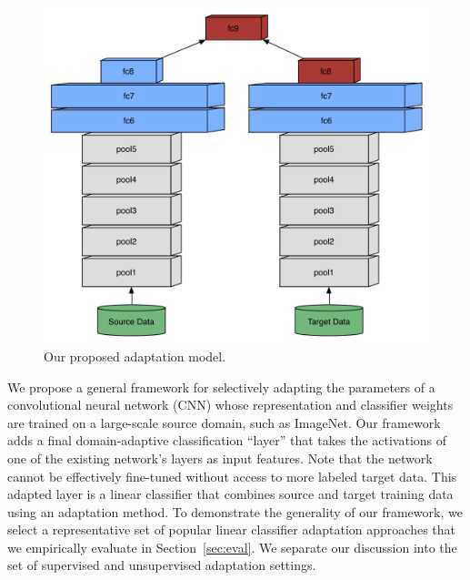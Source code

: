 
\newcommand{\svmT}{\bm{\theta}}
\newcommand{\svmB}{b}
\newcommand{\svmAug}{\tilde{\svmT}}
\newcommand{\svmAugAll}{\bm{\Theta}}

\begin{figure}
\begin{center}
\includegraphics[width=.7\linewidth]{figs/model-adapt}
\end{center}
\caption{Our proposed adaptation model.}
\label{fig:model}
\end{figure}



We propose a general framework for selectively adapting the parameters of a convolutional neural network (CNN) whose representation and classifier weights are trained on a large-scale source domain, such as ImageNet.
Our framework adds a final domain-adaptive classification ``layer'' that takes the activations of one of the existing network's layers as input features. Note that the network cannot be effectively fine-tuned without access to more labeled target data. This adapted layer is a linear classifier that combines source and target training data using an adaptation method. To demonstrate the generality of our framework, we select a representative set of popular linear classifier adaptation approaches that we empirically evaluate in Section~\ref{sec:eval}. We separate our discussion into the set of supervised and unsupervised adaptation settings.

